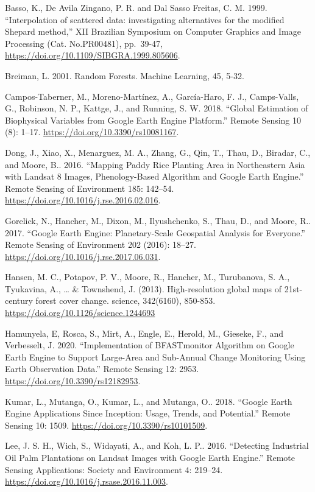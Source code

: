 \documentclass[
  12pt,
  letterpaper,
  twoside]{book}
\begin{document}
Basso, K., De Avila Zingano, P. R. and Dal Sasso Freitas, C. M. 1999. ``Interpolation of scattered data: investigating alternatives for the modified Shepard method,'' XII Brazilian Symposium on Computer Graphics and Image Processing (Cat. No.PR00481), pp.~39-47, \url{https://doi.org/10.1109/SIBGRA.1999.805606}.

Breiman, L. 2001. Random Forests. Machine Learning, 45, 5-32.

Campos-Taberner, M., Moreno-Martínez, A., García-Haro, F. J., Camps-Valls, G., Robinson, N. P., Kattge, J., and Running, S. W. 2018. ``Global Estimation of Biophysical Variables from Google Earth Engine Platform.'' Remote Sensing 10 (8): 1--17. \url{https://doi.org/10.3390/rs10081167}.

Dong, J., Xiao, X., Menarguez, M. A., Zhang, G., Qin, T., Thau, D., Biradar, C., and Moore, B.. 2016. ``Mapping Paddy Rice Planting Area in Northeastern Asia with Landsat 8 Images, Phenology-Based Algorithm and Google Earth Engine.'' Remote Sensing of Environment 185: 142--54. \url{https://doi.org/10.1016/j.rse.2016.02.016}.

Gorelick, N., Hancher, M., Dixon, M., Ilyushchenko, S., Thau, D., and Moore, R.. 2017. ``Google Earth Engine: Planetary-Scale Geospatial Analysis for Everyone.'' Remote Sensing of Environment 202 (2016): 18--27. \url{https://doi.org/10.1016/j.rse.2017.06.031}.

Hansen, M. C., Potapov, P. V., Moore, R., Hancher, M., Turubanova, S. A., Tyukavina, A., \ldots{} \& Townshend, J. (2013). High-resolution global maps of 21st-century forest cover change. science, 342(6160), 850-853. \url{https://doi.org/10.1126/science.1244693}

Hamunyela, E, Rosca, S., Mirt, A., Engle, E., Herold, M., Gieseke, F., and Verbesselt, J. 2020. ``Implementation of BFASTmonitor Algorithm on Google Earth Engine to Support Large-Area and Sub-Annual Change Monitoring Using Earth Observation Data.'' Remote Sensing 12: 2953. \url{https://doi.org/10.3390/rs12182953}.

Kumar, L., Mutanga, O., Kumar, L., and Mutanga, O.. 2018. ``Google Earth Engine Applications Since Inception: Usage, Trends, and Potential.'' Remote Sensing 10: 1509. \url{https://doi.org/10.3390/rs10101509}.

Lee, J. S. H., Wich, S., Widayati, A., and Koh, L. P.. 2016. ``Detecting Industrial Oil Palm Plantations on Landsat Images with Google Earth Engine.'' Remote Sensing Applications: Society and Environment 4: 219--24. \url{https://doi.org/10.1016/j.rsase.2016.11.003}.
\end{document}
